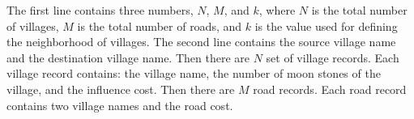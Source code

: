 The first line contains three numbers, $N$, $M$, and $k$, 
where $N$ is the total number of villages, $M$ is the total number of roads, 
and $k$ is the value used for defining the neighborhood of villages. 
The second line contains the source village name and the destination village 
name. Then there are $N$ set of village records. Each village record contains: 
the village name, the number of moon stones of the village, 
and the influence cost. Then there are $M$ road records. 
Each road record contains two village names and the road cost. 
